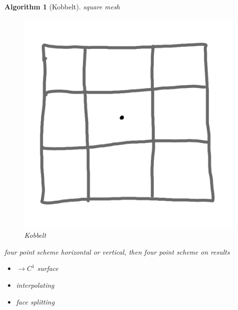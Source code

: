 \documentclass[conference]{IEEEtran}
\newtheorem{algorithm}{Algorithm}
\begin{document}
\begin{algorithm}[Kobbelt]
	square mesh
	
	\begin{figure}[h!]
		\centering
		\includegraphics[width=0.5\linewidth]{figures/kobbelt_short}
		\caption{Kobbelt}
	\end{figure}
	
	four point scheme horizontal or vertical, then four point scheme on results
	
	\begin{itemize}
		\item $\rightarrow C^1$ surface
		\item interpolating
		\item face splitting
	\end{itemize}
\end{algorithm}
\end{document}
